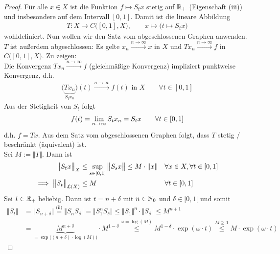\begin{proof}
Für alle $x\in X$ ist die Funktion $f\mapsto S_t x$ stetig auf $\mathbb{R}_+$ (Eigenschaft (iii)) und insbesondere auf dem Intervall $[0,1]$. Damit ist die lineare Abbildung 
\begin{align*}
T:X\to C\big([0,1],X\big),\qquad x\mapsto\big(t\mapsto S_t x\big)
\end{align*}
wohldefiniert. 
Nun wollen wir den Satz vom abgeschlossenen Graphen anwenden. $T$ ist außerdem abgeschlossen: Es gelte $x_n\stackrel{n\to\infty}{\longrightarrow}x$ in $X$ und $T x_n\stackrel{n\to\infty}{\longrightarrow}f$ in $C\big([0,1],X\big)$. Zu zeigen:\\
Die Konvergenz $T x_n\stackrel{n\to\infty}{\longrightarrow}f$ (gleichmäßige Konvergenz) impliziert punktweise Konvergenz, d.h.
\begin{align*}
\big(\underbrace{T x_n}_{S_t x_n}\big)(t)\stackrel{n\to\infty}{\longrightarrow} f(t)\text{ in }X\qquad\forall t\in[0,1]
\end{align*}
Aus der Stetigkeit von $S_t$ folgt
\begin{align*}
f(t)=\lim\limits_{n\to\infty} S_t x_n=S_t x\qquad\forall t\in[0,1]
\end{align*}
d.h. $f=T x$. Aus dem Satz vom abgeschlossenen Graphen folgt, dass $T$ stetig / beschränkt (äquivalent) ist.\\
Sei $M:=\Vert T\Vert$. Dann ist 
\begin{align*}
\big\Vert S_t x\big\Vert_X&\leq\sup\limits_{s\in[0,1]}\big\Vert S_s x\big\Vert\leq M\cdot\Vert x\Vert&\forall& x\in X,\forall t\in[0,1]\\
\implies\big\Vert S_t\big\Vert_{\mathcal{L}(X)}&\leq M &\forall& t\in [0,1]
\end{align*}
Sei $t\in\mathbb{R}_+$ beliebig. Dann ist $t=n+\delta$ mit $n\in\mathbb{N}_0$ und $\delta\in[0,1[$ und somit
\begin{align*}
\big\Vert S_t\big\Vert
&=\big\Vert S_{n+\delta}\big\Vert
\overset{\text{(ii)}}{=}
\big\Vert S_n S_\delta\big\Vert
=\big\Vert S_1^n S_\delta\big\Vert
\leq\big\Vert S_1\big\Vert^n\cdot\big\Vert S_\delta\big\Vert
\leq M^{n+1}\\
&=\underbrace{M^{n+\delta}}_{=\exp\big((n+\delta)\cdot\log(M)\big)}\cdot M^{1-\delta}
\overset{\omega=\log(M)}\leq
M^{1-\delta}\cdot\exp(\omega\cdot t)
\overset{M\geq1}{\leq}
M\cdot\exp(\omega\cdot t)
\end{align*}
\end{proof}

